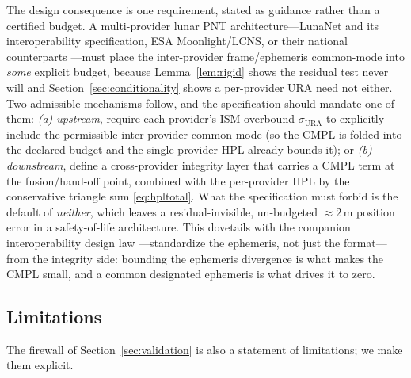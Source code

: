 The design consequence is one requirement, stated as \Modelled{} guidance rather than a
certified budget. A multi-provider lunar PNT architecture---LunaNet and its
interoperability specification, ESA Moonlight/LCNS, or their national counterparts
\citep{israel2020lunanet,fienga2024moonlight}---must place the inter-provider
frame/ephemeris common-mode into \emph{some} explicit budget, because
Lemma~\ref{lem:rigid} shows the residual test never will and Section~\ref{sec:conditionality}
shows a per-provider URA need not either. Two admissible mechanisms follow, and the
specification should mandate one of them: \emph{(a) upstream}, require each provider's
ISM overbound $\sigma_{\mathrm{URA}}$ to explicitly include the permissible
inter-provider common-mode (so the CMPL is folded into the declared budget and the
single-provider HPL already bounds it); or \emph{(b) downstream}, define a
cross-provider integrity layer that carries a CMPL term at the fusion/hand-off point,
combined with the per-provider HPL by the conservative triangle sum \eqref{eq:hpltotal}.
What the specification must forbid is the default of \emph{neither}, which leaves a
residual-invisible, un-budgeted $\approx\!2\,$m position error in a safety-of-life
architecture. This dovetails with the companion interoperability design law
\citep{baweja2026interop}---standardize the ephemeris, not just the format---from the
integrity side: bounding the ephemeris divergence is what makes the CMPL small, and a
common designated ephemeris is what drives it to zero.

\subsection{Limitations}
\label{sec:limitations}

The firewall of Section~\ref{sec:validation} is also a statement of limitations; we make
them explicit.

